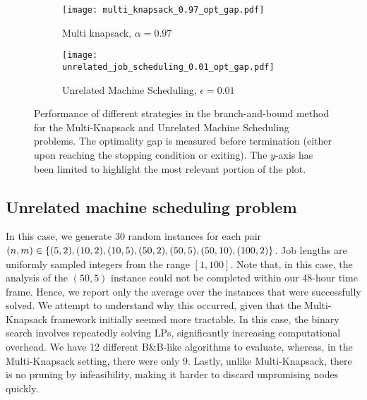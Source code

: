 \documentclass[a4paper,UKenglish,cleveref, autoref, thm-restate, pdfa]{lipics-v2021}
\theoremstyle{plain}
\begin{document}
\begin{figure}
\centering
\begin{subfigure}{0.5\textwidth}
\centering
    \texttt{[image: multi\_knapsack\_0.97\_opt\_gap.pdf]}
    \caption{Multi knapsack, $\alpha = 0.97$}
    \label{fig:mk_gap}
\end{subfigure}\begin{subfigure}{0.5\textwidth}
\centering
    \texttt{[image: unrelated\_job\_scheduling\_0.01\_opt\_gap.pdf]}
    \caption{Unrelated Machine Scheduling, $\epsilon = 0.01$}
    \label{fig:ujs_gap}
\end{subfigure}
\caption{Performance of different strategies in the branch-and-bound method for the Multi-Knapsack and Unrelated Machine Scheduling problems. The optimality gap is measured before termination (either upon reaching the stopping condition or exiting). The $y$-axis has been limited to highlight the most relevant portion of the plot.}
\label{fig:nodes_2}
\end{figure}





\subsection{Unrelated machine scheduling problem}
In this case, we generate 30 random instances for each pair $(n, m) \in \{(5, 2), (10, 2), (10, 5), \\(50, 2), (50, 5), (50, 10), (100, 2)\}$. Job lengths are uniformly sampled integers from the range $[1, 100]$. 
Note that, in this case, the analysis of the $(50, 5)$ instance could not be completed within our 48-hour time frame. Hence, we report only the average over the instances that were successfully solved.  
We attempt to understand why this occurred, given that the Multi-Knapsack framework initially seemed more tractable.  
In this case, the binary search involves repeatedly solving LPs, significantly increasing computational overhead. We have 12 different B\&B-like algorithms to evaluate, whereas, in the Multi-Knapsack setting, there were only 9. Lastly, unlike Multi-Knapsack, there is no pruning by infeasibility, making it harder to discard unpromising nodes quickly.
\end{document}
